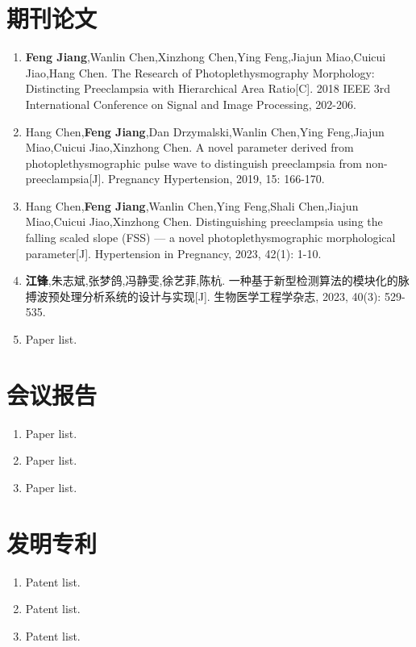 {%
    \section*{期刊论文}
    \begin{enumerate}
        \item \textbf{Feng Jiang},Wanlin Chen,Xinzhong Chen,Ying Feng,Jiajun Miao,Cuicui Jiao,Hang Chen. The Research of 
        Photoplethysmography Morphology: Distincting Preeclampsia with Hierarchical Area Ratio[C]. 
        2018 IEEE 3rd International Conference on Signal and Image Processing, 202-206.
        \item Hang Chen,\textbf{Feng Jiang},Dan Drzymalski,Wanlin Chen,Ying Feng,Jiajun Miao,Cuicui Jiao,Xinzhong Chen. 
        A novel parameter derived from photoplethysmographic pulse wave to distinguish preeclampsia from non-preeclampsia[J]. 
        Pregnancy Hypertension, 2019, 15: 166-170.
        \item Hang Chen,\textbf{Feng Jiang},Wanlin Chen,Ying Feng,Shali Chen,Jiajun Miao,Cuicui Jiao,Xinzhong Chen. 
        Distinguishing preeclampsia using the falling scaled slope (FSS) --- a novel photoplethysmographic morphological parameter[J]. 
        Hypertension in Pregnancy, 2023, 42(1): 1-10.
        \item \textbf{江锋},朱志斌,张梦鸽,冯静雯,徐艺菲,陈杭. 一种基于新型检测算法的模块化的脉搏波预处理分析系统的设计与实现[J]. 
        生物医学工程学杂志, 2023, 40(3): 529-535.
        \item Paper list.
    \end{enumerate}

    \section*{会议报告}
    \begin{enumerate}
        \item Paper list.
        \item Paper list.
        \item Paper list.
    \end{enumerate}

    \section*{发明专利}
    \begin{enumerate}
        \item Patent list.
        \item Patent list.
        \item Patent list.
    \end{enumerate}
}